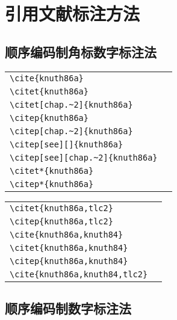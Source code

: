 \chapter{引用文献标注方法}

\section{顺序编码制角标数字标注法}

\noindent
\begin{tabular}{l@{\quad$\Rightarrow$\quad}l}
  \verb|\cite{knuth86a}| & \cite{knuth86a}\\
  \verb|\citet{knuth86a}| & \citet{knuth86a}\\
  \verb|\citet[chap.~2]{knuth86a}| & \citet[chap.~2]{knuth86a}\\[0.5ex]
  \verb|\citep{knuth86a}| & \citep{knuth86a}\\
  \verb|\citep[chap.~2]{knuth86a}| & \citep[chap.~2]{knuth86a}\\
  \verb|\citep[see][]{knuth86a}| & \citep[see][]{knuth86a}\\
  \verb|\citep[see][chap.~2]{knuth86a}| & \citep[see][chap.~2]{knuth86a}\\[0.5ex]
  \verb|\citet*{knuth86a}| & \citet*{knuth86a}\\
  \verb|\citep*{knuth86a}| & \citep*{knuth86a}\\
\end{tabular}
\par\noindent
\begin{tabular}{l@{\quad$\Rightarrow$\quad}l}
  \verb|\citet{knuth86a,tlc2}| & \citet{knuth86a,tlc2}\\
  \verb|\citep{knuth86a,tlc2}| & \citep{knuth86a,tlc2}\\
  \verb|\cite{knuth86a,knuth84}| & \cite{knuth86a,knuth84}\\
  \verb|\citet{knuth86a,knuth84}| & \citet{knuth86a,knuth84}\\
  \verb|\citep{knuth86a,knuth84}| & \citep{knuth86a,knuth84}\\
  \verb|\cite{knuth86a,knuth84,tlc2}| & \cite{knuth86a,knuth84,tlc2}\\
\end{tabular}



\section{顺序编码制数字标注法}

